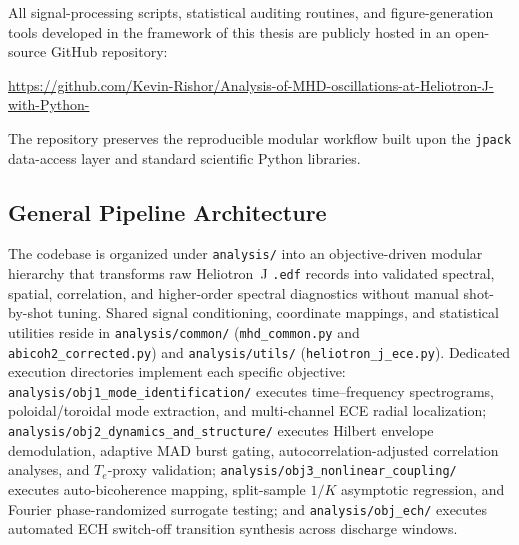 
\clearpage
{}
\setcounter{section}{0}
\renewcommand{\thesection}{\Alph{section}}
\renewcommand{\theHsection}{appendix.\thesection} %
\renewcommand{\theHsubsection}{appendix.\thesection.\arabic{subsection}}
\label{appendix:github}

All signal-processing scripts, statistical auditing routines, and figure-generation tools developed in the framework of this thesis are publicly hosted in an open-source GitHub repository:\par\smallskip\noindent
{\footnotesize\url{https://github.com/Kevin-Rishor/Analysis-of-MHD-oscillations-at-Heliotron-J-with-Python-}}

The repository preserves the reproducible modular workflow built upon the \texttt{jpack} data-access layer and standard scientific Python libraries.

\subsection{General Pipeline Architecture}
\begin{sloppypar}
The codebase is organized under \texttt{analysis/} into an objective-driven modular hierarchy that transforms raw Heliotron~J \texttt{.edf} records into validated spectral, spatial, correlation, and higher-order spectral diagnostics without manual shot-by-shot tuning. Shared signal conditioning, coordinate mappings, and statistical utilities reside in \texttt{analysis/\allowbreak common/} (\texttt{mhd\_\allowbreak common.py} and \texttt{abicoh2\_\allowbreak corrected.py}) and \texttt{analysis/\allowbreak utils/} (\texttt{heliotron\_\allowbreak j\_\allowbreak ece.py}). Dedicated execution directories implement each specific objective: \texttt{analysis/\allowbreak obj1\_\allowbreak mode\_\allowbreak identification/} executes time--frequency spectrograms, poloidal/toroidal mode extraction, and multi-channel ECE radial localization; \texttt{analysis/\allowbreak obj2\_\allowbreak dynamics\_\allowbreak and\_\allowbreak structure/} executes Hilbert envelope demodulation, adaptive MAD burst gating, autocorrelation-adjusted correlation analyses, and $T_e$-proxy validation; \texttt{analysis/\allowbreak obj3\_\allowbreak nonlinear\_\allowbreak coupling/} executes auto-bicoherence mapping, split-sample $1/K$ asymptotic regression, and Fourier phase-randomized surrogate testing; and \texttt{analysis/\allowbreak obj\_\allowbreak ech/} executes automated ECH switch-off transition synthesis across discharge windows.
\end{sloppypar}

